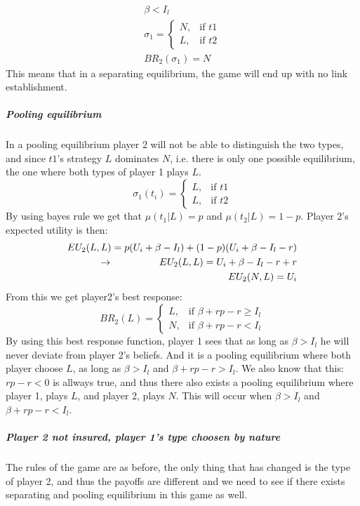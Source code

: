 \begin{eqnarray}
\beta<I_{l}\\
 \sigma_{1}= 
\begin{cases}
   N,& \text{if } t1\\
   L,& \text{if } t2  
\end{cases}\\
BR_{2}(\sigma_{1})=N
\end{eqnarray} 
This means that in a separating equilibrium, the game will end up with no link establishment.
\subparagraph{Pooling equilibrium}
In a pooling equilibrium player 2 will not be able to distinguish the two types, and since $t1$'s strategy $L$ dominates $N$, i.e. there is only one possible equilibrium, the one where both types of player 1 plays $L$.
\begin{equation}
    \sigma_{1}(t_{i})= 
\begin{cases}
   L,& \text{if } t1\\
   L,& \text{if } t2  
\end{cases}
\label{eq:player2beliefpooling}
\end{equation}
By using bayes rule we get that $\mu(t_{1}|L)=p$ and $\mu(t_{2}|L)=1-p$.
Player 2's expected utility is then:
\begin{eqnarray}
EU_{2}(L,L)=p(U_{i}+\beta-I_{l})+(1-p)(U_{i}+\beta-I_{l}-r)\nonumber\\
\llap{$\rightarrow$\hspace{50pt}}EU_{2}(L,L)=U_{i}+\beta-I_{l}-r+r\\
EU_{2}(N,L)=U_{i}
\end{eqnarray}
From this we get player2's best response:
\begin{equation}
BR_{2}(L)=
\begin{cases}
L ,& \text{if } \beta + rp-r\geq I_{l} \\
N ,& \text{if } \beta +rp -r < I_{l} 
\end{cases}
\end{equation}
By using this best response function, player 1 sees that as long as $\beta>I_{l}$ he will never deviate from player 2's beliefs. And it is a pooling equilibrium where both player choose $L$, as long as $\beta>I_{l}$ and $\beta +rp-r>I_{l}$.
We also know that this: $rp-r<0$ is allways true, and thus there also exists a pooling equilibrium where player 1, plays $L$, and player 2, plays $N$. This will occur when $\beta>I_{l}$ and $\beta+rp-r<I_{l}$.
\subparagraph{Player 2 not insured, player 1's type choosen by nature}
The rules of the game are as before, the only thing that has changed is the type of player 2, and thus the payoffs are different and we need to see if there exists separating and pooling equilibrium in this game as well.
